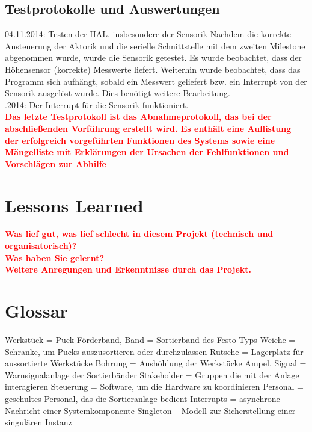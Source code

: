 \documentclass[oneside,a4paper,titlepage]{scrartcl} %
\begin{document}
\subsection{Testprotokolle und Auswertungen}
04.11.2014: Testen der HAL, insbesondere der Sensorik \newline
Nachdem die korrekte Ansteuerung der Aktorik und die serielle Schnittstelle mit dem zweiten Milestone abgenommen wurde, wurde die Sensorik getestet. Es wurde beobachtet, dass der Höhensensor (korrekte) Messwerte liefert. Weiterhin wurde beobachtet, dass das Programm sich aufhängt, sobald ein Messwert geliefert bzw. ein Interrupt von der Sensorik ausgelöst wurde. Dies benötigt weitere Bearbeitung.\\
.2014: Der Interrupt für die Sensorik funktioniert.\\
\newline
\textcolor{red}{\textbf{
Das letzte Testprotokoll ist das Abnahmeprotokoll, das bei der abschließenden Vorführung erstellt
wird. Es enthält eine Auflistung der erfolgreich vorgeführten Funktionen des Systems sowie eine
Mängelliste mit Erklärungen der Ursachen der Fehlfunktionen und Vorschlägen zur Abhilfe}}

\section{Lessons Learned}
\textcolor{red}{\textbf{Was lief gut, was lief schlecht in diesem Projekt (technisch und organisatorisch)?\\
Was haben Sie gelernt?\\
Weitere Anregungen und Erkenntnisse durch das Projekt.}}

\newpage

\section{Glossar}
Werkstück = Puck\newline 
Förderband, Band = Sortierband des Festo-Typs\newline
Weiche = Schranke, um Pucks auszusortieren oder durchzulassen\newline
Rutsche = Lagerplatz für aussortierte Werkstücke\newline
Bohrung = Aushöhlung der Werkstücke\newline
Ampel, Signal = Warnsignalanlage der Sortierbänder\newline
Stakeholder = Gruppen die mit der Anlage interagieren\newline
Steuerung = Software, um die Hardware zu koordinieren\newline
Personal = geschultes Personal, das die Sortieranlage bedient\newline
Interrupts = asynchrone Nachricht einer Systemkomponente\newline
Singleton – Modell zur Sicherstellung einer singulären Instanz\newline
\end{document}
